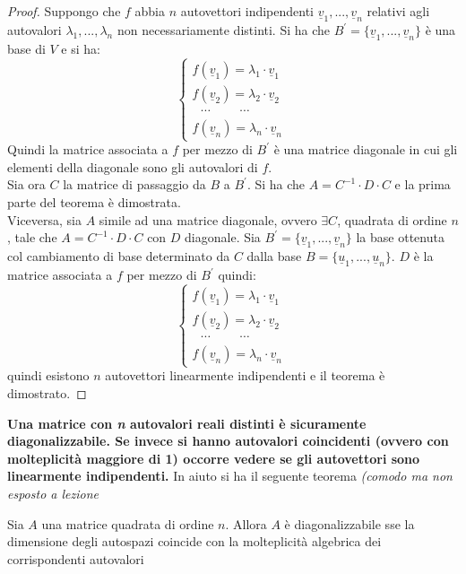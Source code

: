 \documentclass[a4paper,12pt, oneside]{book}
\begin{document}
\begin{proof}
Suppongo che $f$ abbia $n$ autovettori indipendenti $\underline{v}_1,...,\underline{v}_n$ relativi agli autovalori $\lambda_1,...,\lambda_n$ non necessariamente distinti. Si ha che $B^{'}=\{\underline{v}_1,...,\underline{v}_n\}$ è una base di $V$ e si ha:
$$\begin{cases}
f(\underline{v}_1)=\lambda_1\cdot \underline{v}_1\\
f(\underline{v}_2)=\lambda_2\cdot \underline{v}_2\\
\,\,\,\,\cdots\,\,\,\,\,\,\,\,\,\,\,\,\,\,\cdots\\
f(\underline{v}_n)=\lambda_n\cdot \underline{v}_n\
\end{cases}$$
Quindi la matrice associata a $f$ per mezzo di $B^{'}$ è una matrice diagonale in cui gli elementi della diagonale sono gli autovalori di $f$.\\
Sia ora $C$ la matrice di passaggio da $B$ a $B^{'}$. Si ha che $A=C^{-1}\cdot D\cdot C$ e la prima parte del teorema è dimostrata.\\
Viceversa, sia $A$ simile ad una matrice diagonale, ovvero $\exists C$, quadrata di ordine $n$, tale che $A=C^{-1}\cdot D\cdot C$ con $D$ diagonale. Sia $B^{'}=\{\underline{v}_1,...,\underline{v}_n\}$ la base ottenuta col cambiamento di base determinato da $C$ dalla base $B=\{\underline{u}_1,...,\underline{u}_n\}$. $D$ è la matrice associata a $f$ per mezzo di $B^{'}$ quindi:
$$\begin{cases}
f(\underline{v}_1)=\lambda_1\cdot \underline{v}_1\\
f(\underline{v}_2)=\lambda_2\cdot \underline{v}_2\\
\,\,\,\,\cdots\,\,\,\,\,\,\,\,\,\,\,\,\,\,\cdots\\
f(\underline{v}_n)=\lambda_n\cdot \underline{v}_n\
\end{cases}$$
quindi esistono $n$ autovettori linearmente indipendenti e il teorema è dimostrato.
\end{proof}
\textbf{Una matrice con \textit{n} autovalori reali distinti è sicuramente diagonalizzabile. Se invece si hanno autovalori coincidenti (ovvero con molteplicità maggiore di 1) occorre vedere se gli autovettori sono linearmente indipendenti. }
In aiuto si ha il seguente teorema \textit{(comodo ma non esposto a lezione}
\begin{teorema}[bonus]
Sia $A$ una matrice quadrata di ordine $n$. Allora $A$ è diagonalizzabile sse la dimensione degli autospazi coincide con la molteplicità algebrica dei corrispondenti autovalori
\end{teorema}
\end{document}

